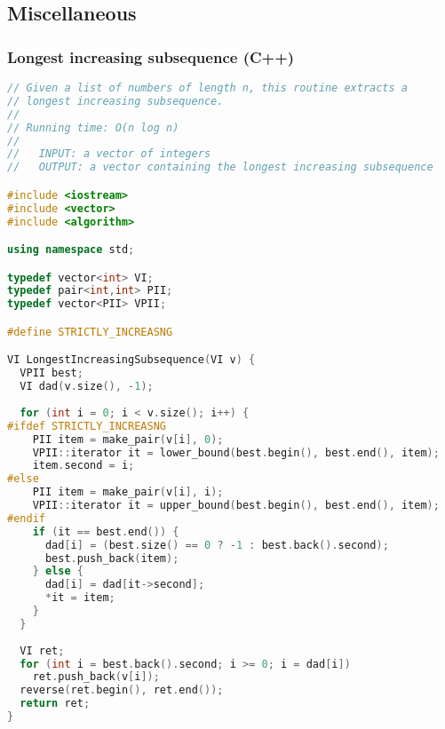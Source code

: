 \subsection{Miscellaneous}
\subsubsection{Longest increasing subsequence (C++)}
\begin{lstlisting}[language=C++]
// Given a list of numbers of length n, this routine extracts a 
// longest increasing subsequence.
//
// Running time: O(n log n)
//
//   INPUT: a vector of integers
//   OUTPUT: a vector containing the longest increasing subsequence

#include <iostream>
#include <vector>
#include <algorithm>

using namespace std;

typedef vector<int> VI;
typedef pair<int,int> PII;
typedef vector<PII> VPII;

#define STRICTLY_INCREASNG

VI LongestIncreasingSubsequence(VI v) {
  VPII best;
  VI dad(v.size(), -1);
  
  for (int i = 0; i < v.size(); i++) {
#ifdef STRICTLY_INCREASNG
    PII item = make_pair(v[i], 0);
    VPII::iterator it = lower_bound(best.begin(), best.end(), item);
    item.second = i;
#else
    PII item = make_pair(v[i], i);
    VPII::iterator it = upper_bound(best.begin(), best.end(), item);
#endif
    if (it == best.end()) {
      dad[i] = (best.size() == 0 ? -1 : best.back().second);
      best.push_back(item);
    } else {
      dad[i] = dad[it->second];
      *it = item;
    }
  }
  
  VI ret;
  for (int i = best.back().second; i >= 0; i = dad[i])
    ret.push_back(v[i]);
  reverse(ret.begin(), ret.end());
  return ret;
}

\end{lstlisting}
